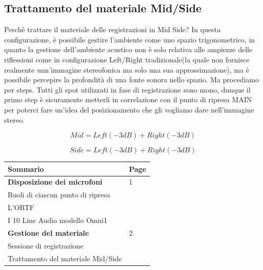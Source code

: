 \subsection*{Trattamento del materiale Mid/Side}
Perchè trattare il materiale delle registrazioni in Mid Side? In questa configurazione, è possibile gestire l'ambiente come uno spazio trigonometrico, in quanto la gestione dell'ambiente acustico non è solo relativa alle ampiezze delle riflessioni come in configurazione Left/Right tradizionale(la quale non fornisce realmente unn'immagine stereofonica ma solo una sua approssimazione), ma è possibile percepire la profondità di una fonte sonora nello spazio.
Ma procediamo per steps.
Tutti gli spot utilizzati in fase di registrazione sono mono, dunque il primo step è sicuramente metterli in correlazione con il punto di ripresa MAIN per poterci fare un'idea del posizionamento che  gli vogliamo dare nell'immagine stereo.

\begin{equation}
	Mid = Left(-3dB) + Right(-3dB)
	\label{eq:mid}
\end{equation}

\begin{equation}
	Side = Left(-3dB) + Right(-3dB)
	\label{eq:mid}
\end{equation}


\vfill\null

\newpage %

\begin{table}[htp]
\begin{tabular}{ll}
\textbf{Sommario} & \textbf{Page} \\
\hline
\textbf{Disposizione dei microfoni} & 1 \\
Ruoli di ciascun punto di ripresa & \\
L'ORTF & \\
I 10 Line Audio modello Omni1 & \\
\hline
\textbf{Gestione del materiale} & 2 \\
Sessione di registrazione & \\
Trattamento del materiale Mid/Side & \\

\end{tabular}
\end{table}

